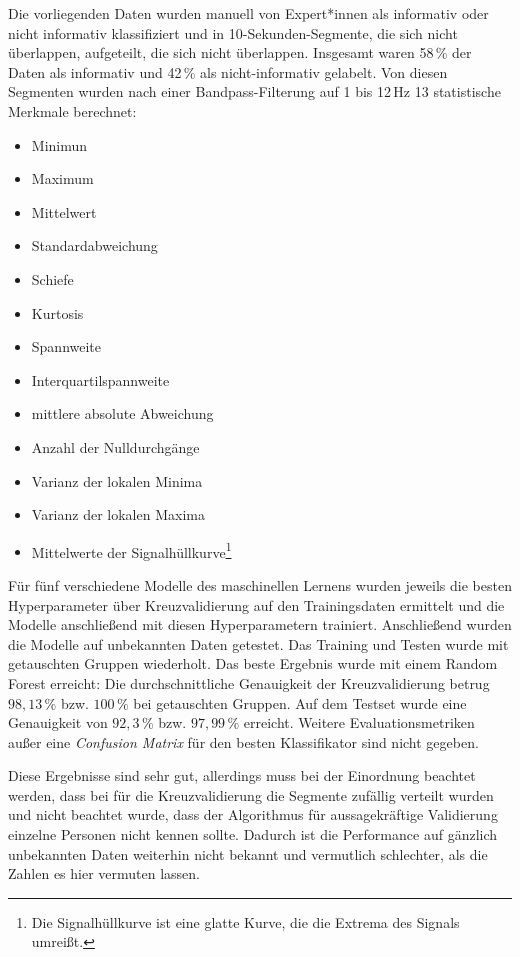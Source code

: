 	Die vorliegenden Daten wurden manuell von Expert*innen als informativ oder nicht informativ klassifiziert und in 10-Sekunden-Segmente, die sich nicht überlappen, aufgeteilt, die sich nicht überlappen. Insgesamt waren 58\,\% der Daten als informativ und 42\,\% als nicht-informativ gelabelt. Von diesen Segmenten wurden nach einer Bandpass-Filterung auf 1 bis 12\,Hz 13 statistische Merkmale berechnet:
	\begin{itemize}
		\item Minimun
		\item Maximum
		\item Mittelwert
		\item Standardabweichung
		\item Schiefe
		\item Kurtosis
		\item Spannweite
		\item Interquartilspannweite
		\item mittlere absolute Abweichung
		\item Anzahl der Nulldurchgänge
		\item Varianz der lokalen Minima
		\item Varianz der lokalen Maxima
		\item Mittelwerte der Signalhüllkurve\footnote{Die Signalhüllkurve ist eine glatte Kurve, die die Extrema des Signals umreißt.}
	\end{itemize}
	
	Für fünf verschiedene Modelle des maschinellen Lernens wurden jeweils die besten Hyperparameter über Kreuzvalidierung auf den Trainingsdaten ermittelt und die Modelle anschließend mit diesen Hyperparametern trainiert. Anschließend wurden die Modelle auf unbekannten Daten getestet. Das Training und Testen wurde mit getauschten Gruppen wiederholt. Das beste Ergebnis wurde mit einem Random Forest erreicht: Die durchschnittliche Genauigkeit der Kreuzvalidierung betrug $98{,}13\,\% $ bzw. $100\,\%$ bei getauschten Gruppen. Auf dem Testset wurde eine Genauigkeit von $92{,}3\,\%$ bzw. $97{,}99\,\%$ erreicht. Weitere Evaluationsmetriken außer eine \textit{Confusion Matrix} für den besten Klassifikator sind nicht gegeben.
	
	Diese Ergebnisse sind sehr gut, allerdings muss bei der Einordnung beachtet werden, dass bei für die Kreuzvalidierung die Segmente zufällig verteilt wurden und nicht beachtet wurde, dass der Algorithmus für aussagekräftige Validierung einzelne Personen nicht kennen sollte. Dadurch ist die Performance auf gänzlich unbekannten Daten weiterhin nicht bekannt und vermutlich schlechter, als die Zahlen es hier vermuten lassen.
	
